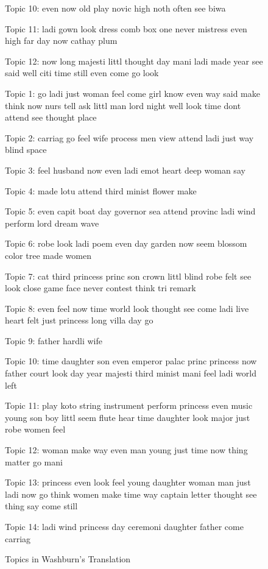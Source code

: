 \documentclass[12pt]{article}
\begin{document}
\begin{flushleft}
\begin{spacing}{2.0}
\begin{figure}
Topic 10: even now old play novic high noth often see biwa 

Topic 11: ladi gown look dress comb box one never mistress even high far day now cathay plum 

Topic 12: now long majesti littl thought day mani ladi made year see said well citi time still even come go look 
\end{figure}


\begin{figure}
\label{washburn-topics}
\caption{Topics in Washburn's Translation}
\singlespacing
\small
Topic 1: go ladi just woman feel come girl know even way said make think now nurs tell ask littl man lord night well look time dont attend see thought place 

Topic 2: carriag go feel wife process men view attend ladi just way blind space 

Topic 3: feel husband now even ladi emot heart deep woman say 

Topic 4: made lotu attend third minist flower make 

Topic 5: even capit boat day governor sea attend provinc ladi wind perform lord dream wave 

Topic 6: robe look ladi poem even day garden now seem blossom color tree made women 

Topic 7: cat third princess princ son crown littl blind robe felt see look close game face never contest think tri remark 

Topic 8: even feel now time world look thought see come ladi live heart felt just princess long villa day go 

Topic 9: father hardli wife 

Topic 10: time daughter son even emperor palac princ princess now father court look day year majesti third minist mani feel ladi world left 

Topic 11: play koto string instrument perform princess even music young son boy littl seem flute hear time daughter look major just robe women feel 

Topic 12: woman make way even man young just time now thing matter go mani 

Topic 13: princess even look feel young daughter woman man just ladi now go think women make time way captain letter thought see thing say come still 

Topic 14: ladi wind princess day ceremoni daughter father come carriag 
\end{figure}



\end{spacing}
\end{flushleft}
\end{document}
